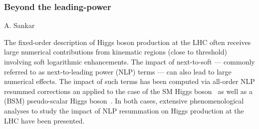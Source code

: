 \documentclass{FBR_Bericht_2025}
\begin{document}
\begin{refsection}
\subsubsection{Beyond the leading-power}
\begin{Namen}
A. Sankar
\end{Namen}
%
The fixed-order description of Higgs boson production at the LHC often receives large numerical contributions from kinematic regions (close to threshold) involving soft logarithmic enhancements. The impact of next-to-soft --- commonly referred to as next-to-leading power (NLP) terms --- can also lead to large numerical effects.
%
The impact of such terms has been computed via all-order NLP resummed corrections an applied to the case of the SM Higgs boson~ as well as a (BSM) pseudo-scalar Higgs boson~. In both cases, extensive phenomenological analyses to study the impact of NLP resummation on Higgs production at the LHC have been presented.


\printbibliography[heading=subbibliography]
\end{refsection}
\end{document}
